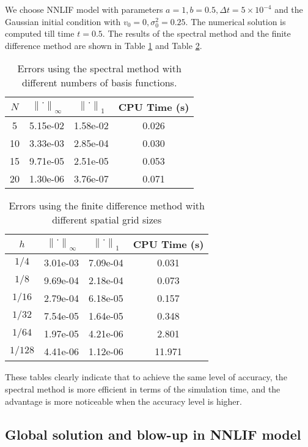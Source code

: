 We choose NNLIF model with parameters $a=1,b=0.5,\Delta t=5\times 10^{-4}$ and the Gaussian initial condition with $v_0=0,\sigma_0^2=0.25$. The numerical solution is computed till time $t=0.5$. The results of the spectral method and the finite difference method are shown in Table \ref{error1} and Table \ref{error2}.
\begin{table}[!htb]
	\centering
	\begin{tabularx}{8cm}{cccc}
	\toprule
	$N$& $\left\| \cdot \right\|_{\infty}$&$\left\| \cdot \right\|_{1}$& CPU Time (s) \\ 
	\midrule
	5 & 5.15e-02 & 1.58e-02& 0.026 \\
    10 & 3.33e-03 & 2.85e-04 & 0.030  \\
    15 & 9.71e-05 & 2.51e-05& 0.053 \\
    20 & 1.30e-06 & 3.76e-07 & 0.071  \\
	\bottomrule
    \end{tabularx}
    \caption{Errors using the spectral method with different numbers of basis functions.}
    \label{error1}
\end{table}

\begin{table}[!htb]
	\centering
	\begin{tabularx}{8cm}{cccc}
	\toprule
	$h$& $\left\| \cdot \right\|_{\infty}$&$\left\| \cdot \right\|_{1}$& CPU Time (s) \\ 
	\midrule
    ${1/4}$ & 3.01e-03 & 7.09e-04& 0.031 \\
    ${1/8}$ & 9.69e-04 & 2.18e-04& 0.073 \\
    ${1/16}$ & 2.79e-04 & 6.18e-05 & 0.157  \\
    ${1/32}$ & 7.54e-05 & 1.64e-05& 0.348 \\
    ${1/64}$ & 1.97e-05 & 4.21e-06 & 2.801  \\
    ${1/128}$ & 4.41e-06 & 1.12e-06 & 11.971  \\
	\bottomrule
    \end{tabularx}
    \caption{Errors using the finite difference method  with different spatial grid sizes}
    \label{error2}
\end{table}
These tables clearly indicate that to achieve the same level of accuracy, the spectral method is more efficient in terms of the simulation time, and the advantage is more noticeable when the accuracy level is higher.



\subsection{Global solution and blow-up in NNLIF model}\label{sec:blow_up}
